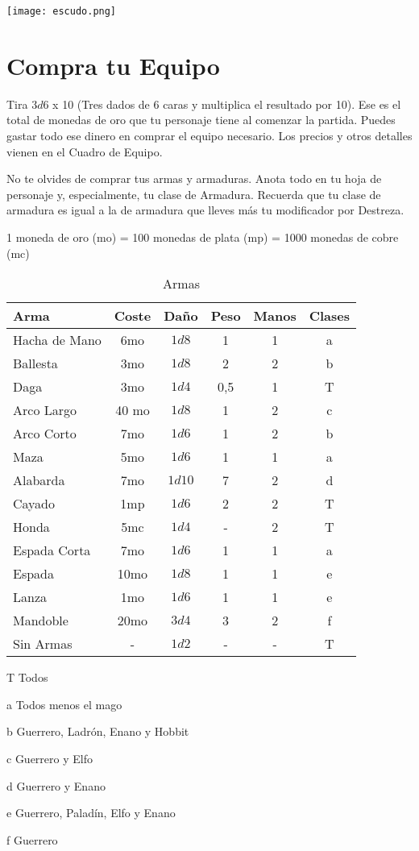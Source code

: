 \begin{multicols}{2}
\texttt{[image: escudo.png]}

\section{Compra tu Equipo}

Tira $ 3d6$ x 10 (Tres dados de 6 caras y multiplica el resultado por 10). Ese es
el total de monedas de oro que tu personaje tiene al comenzar la partida. Puedes
gastar todo ese dinero en comprar el equipo necesario. Los precios y otros
detalles vienen en el Cuadro de Equipo.

No te olvides de comprar tus armas y armaduras. Anota todo en tu hoja de personaje
y, especialmente, tu clase de Armadura. Recuerda que tu clase de armadura es igual
a la de armadura que lleves más tu modificador por Destreza.

1 moneda de oro (mo) = 100 monedas de plata (mp) = 1000 monedas de cobre (mc)

\begin{table*}[p]
\centering
\begin{threeparttable}
\caption{Armas}
\begin{tabular}{lccccc}
\toprule
Arma  &  Coste & Daño & Peso & Manos & Clases\\
\midrule
\midrule
Hacha de Mano & 6mo & $ 1d8$ & 1 & 1 & a\\
Ballesta      & 3mo & $ 1d8$ & 2 & 2 & b\\
Daga  & 3mo & $ 1d4$ & 0,5 & 1 & T \\
Arco Largo & 40 mo & $ 1d8$ & 1 & 2 & c \\
Arco Corto & 7mo & $ 1d6$ & 1 & 2 & b \\
Maza &  5mo &  $ 1d6$ &  1 & 1 & a\\
Alabarda & 7mo & $1d10$ & 7 & 2 & d\\
Cayado & 1mp & $ 1d6$ & 2 & 2 & T\\
Honda & 5mc & $ 1d4$ & - & 2 & T\\
Espada Corta & 7mo &  $ 1d6$ & 1 & 1 & a \\
Espada & 10mo & $ 1d8$ & 1 & 1 & e\\
Lanza & 1mo &  $ 1d6$ & 1 & 1 & e\\
Mandoble & 20mo & $ 3d4$ & 3 & 2 & f \\
Sin Armas & - & $ 1d2$ & - & - & T\\
\bottomrule
\end{tabular}

\begin{tablenotes}
  \item T Todos
  \item a Todos menos el mago
  \item b Guerrero, Ladrón, Enano y Hobbit
  \item c Guerrero y Elfo
  \item d Guerrero y Enano
  \item e Guerrero, Paladín, Elfo y Enano
  \item f Guerrero
\end{tablenotes}
\end{threeparttable}
\end{table*}


\end{multicols}
